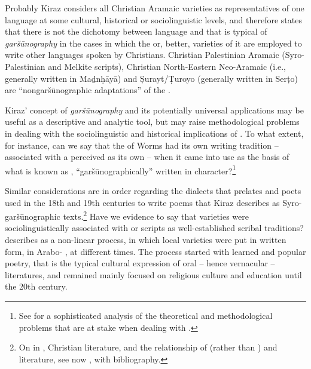 \documentclass[output=paper,colorlinks,citecolor=brown,arabfont,syriacfont]{langscibook}
\begin{document}
Probably Kiraz considers all Christian Aramaic varieties as representatives of one language at some cultural, historical or sociolinguistic levels, and therefore states that there is not the dichotomy between language and  that is typical of \textit{garšūnography} in the cases in which the   or, better, varieties of it are employed to write other  languages spoken by Christians. Christian Palestinian Aramaic (Syro-Palestinian and Melkite scripts), Christian North-Eastern Neo-Aramaic (i.e.,  generally written in Maḏnḥāyā) and Ṣurayt/Ṭuroyo (generally written in Serṭo) are ``nongaršūnographic adaptations'' of the   \citep[353--358]{kiraz2012}. 

Kiraz' concept of \textit{garšūnography} and its potentially universal applications may be useful as a descriptive and analytic tool, but may raise methodological problems in dealing with the sociolinguistic and historical implications of . To what extent, for instance, can we say that the   of Worms had its own writing tradition -- associated with a  perceived as its own -- when it came into use as the basis of what is known as , ``garšūnographically'' written in  character?\footnote{%
See \citet{den_heijer_schmidt_pataridze2014} for a sophisticated analysis of the theoretical and methodological problems that are at stake when dealing with .}

Similar considerations are in order regarding the  dialects that  prelates and poets used in the 18th and 19th centuries to write poems that Kiraz describes as Syro- garšūnographic texts.\footnote{%
On  in  , Christian  literature, and the relationship of  (rather than ) and  literature, see now \citet{kaplan2023}, with bibliography.} Have we evidence to say that  varieties were sociolinguistically associated with  or  scripts as well-established scribal traditions? \citet{leezenberg2014,leezenberg2020} describes   as a non-linear process, in which local varieties were put in written form, in Arabo- , at different times. The process started with learned and popular poetry, that is the typical cultural expression of oral -- hence vernacular -- literatures, and remained mainly focused on religious culture and education until the 20th century.
\end{document}
